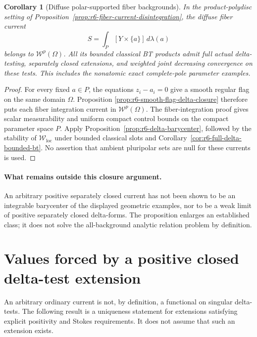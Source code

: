 \documentclass[11pt,a4paper]{article}
\numberwithin{equation}{section}
\newtheorem{corollary}[theorem]{Corollary}
\theoremstyle{definition}
\theoremstyle{remark}
\begin{document}
\begin{corollary}[Diffuse polar-supported fiber backgrounds]
\label{cor:r6-laminar-full-delta-tests}
In the product-polydisc setting of
Proposition~\ref{prop:r6-fiber-current-disintegration}, the diffuse
fiber current
\[
                    S=\int_P[Y\times\{a\}]\,d\lambda(a)
\]
belongs to $\mathcal W^p(\Omega)$. All its bounded classical BT
products admit full actual delta-testing, separately closed extensions,
and weighted joint decreasing convergence on these tests.
This includes the nonatomic exact complete-pole parameter examples.
\end{corollary}

\begin{proof}
For every fixed $a\in P$, the equations $z_i-a_i=0$ give a smooth
regular flag on the same domain $\Omega$. Proposition
\ref{prop:r6-smooth-flag-delta-closure} therefore puts each fiber
integration current in $\mathcal W^p(\Omega)$.
The fiber-integration proof gives scalar measurability and uniform
compact control bounds on the compact parameter space $P$.
Apply Proposition~\ref{prop:r6-delta-barycenter}, followed by the
stability of $\mathcal W_{\mathrm{loc}}$ under bounded classical
slots and Corollary~\ref{cor:r6-full-delta-bounded-bt}. No assertion
that ambient pluripolar sets are null for these currents is used.
\end{proof}

\paragraph{What remains outside this closure argument.}
An arbitrary positive separately closed current has not been shown
to be an integrable barycenter of the displayed geometric examples,
nor to be a weak limit of positive separately closed delta-forms.
The proposition enlarges an established class; it does not solve
the all-background analytic relation problem by definition.



\section{Values forced by a positive closed delta-test extension}
\label{sec:r6-delta-extension-uniqueness}

An arbitrary ordinary current is not, by definition, a functional on
singular delta-tests.  The following result is a uniqueness statement
for extensions satisfying explicit positivity and Stokes requirements.
It does not assume that such an extension exists.
\end{document}
